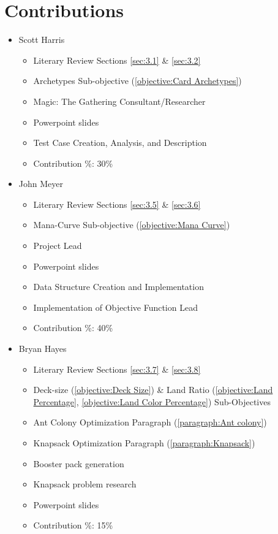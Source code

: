 \documentclass[12pt, letterpaper]{article}
\begin{document}
\section{Contributions}

\begin{itemize}

\item Scott Harris

\begin{itemize}

    \item Literary Review Sections \ref{sec:3.1} \& \ref{sec:3.2}
    \item Archetypes Sub-objective (\ref{objective:Card Archetypes})
    \item Magic: The Gathering Consultant/Researcher
	\item Powerpoint slides
    \item Test Case Creation, Analysis, and Description
    \item Contribution \%: 30\%

\end{itemize}

\item John Meyer

\begin{itemize}

    \item Literary Review Sections \ref{sec:3.5} \& \ref{sec:3.6}
    \item Mana-Curve Sub-objective (\ref{objective:Mana Curve})
    \item Project Lead
	\item Powerpoint slides
    \item Data Structure Creation and Implementation
    \item Implementation of Objective Function Lead
    \item Contribution \%: 40\%

\end{itemize}

\item Bryan Hayes

\begin{itemize}

    \item Literary Review Sections \ref{sec:3.7} \& \ref{sec:3.8}
    \item Deck-size (\ref{objective:Deck Size}) \&
        Land Ratio (\ref{objective:Land Percentage}, \ref{objective:Land Color Percentage}) Sub-Objectives
    \item Ant Colony Optimization Paragraph (\ref{paragraph:Ant colony})
	\item Knapsack Optimization Paragraph (\ref{paragraph:Knapsack})
	\item Booster pack generation
	\item Knapsack problem research
	\item Powerpoint slides
    \item Contribution \%: 15\%


\end{itemize}
\end{itemize}
\end{document}
